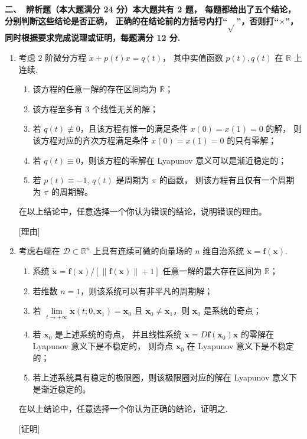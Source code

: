 \textbf{二、\ 辨析题（本大题满分 24 分）本大题共有 2 题，
每题都给出了五个结论，分别判断这些结论是否正确，
正确的在结论前的方括号内打``$\sqrt{ }$''，否则打``$\times$''，
同时根据要求完成说理或证明，每题满分 12 分.}
\begin{enumerate}
\item 考虑 $2$ 阶微分方程 $\ddot{x}+p(t) x=q(t)$，
其中实值函数 $p(t), q(t)$ 在 $\mathbb{R}$ 上连续.
\begin{enumerate}[label=$【\qquad】$]
    \item 该方程的任意一解的存在区间均为 $\mathbb{R}$；
    \item 该方程至多有 $3$ 个线性无关的解；
    \item 若 $q(t) \not \equiv 0$，且该方程有惟一的满足条件 $x(0)=x(1)=0$ 的解，
    则该方程对应的齐次方程满足条件 $x(0)=x(1)=0$ 的只有零解；
    \item 若 $q(t) \equiv 0$，则该方程的零解在 Lyapunov 意义可以是渐近稳定的；
    \item 若 $p(t) \equiv-1$, $q(t)$ 是周期为 $\pi$ 的函数，
    则该方程有且仅有一个周期为 $\pi$ 的周期解。
\end{enumerate}
在以上结论中，任意选择一个你认为错误的结论，说明错误的理由。

[理由]

\item 考虑右端在 $\mathcal{D} \subset \mathbb{R}^n$ 上具有连续可微的向量场的 $n$ 维自治系统 
$\dot{\boldsymbol{x}}=\boldsymbol{f}(\boldsymbol{x})$.
\begin{enumerate}[label=$【\qquad】$]
    \item 系统 $\dot{\boldsymbol{x}}=\boldsymbol{f}(\boldsymbol{x}) /[\|\boldsymbol{f}(\boldsymbol{x})\|+1]$ 任意一解的最大存在区间为 $\mathbb{R}$；
    \item 若维数 $n=1$，则该系统可以有非平凡的周期解；
    \item 若 $\lim\limits_{t \rightarrow+\infty} \boldsymbol{x}(t ; 0, \boldsymbol{x}_1)=\boldsymbol{x}_0$ 
    且 $\boldsymbol{x}_0 \neq \boldsymbol{x}_1$，则 $\boldsymbol{x}_0$ 是系统的奇点；
    \item 若 $\boldsymbol{x}_0$ 是上述系统的奇点，
    并且线性系统 $\dot{\boldsymbol{x}}=D \boldsymbol{f}(\boldsymbol{x}_0) \boldsymbol{x}$ 的零解在 Lyapunov 意义下是不稳定的，
    则奇点 $\boldsymbol{x}_0$ 在 Lyapunov 意义下是不稳定的；
    \item 若上述系统具有稳定的极限圈，则该极限圈对应的解在 Lyapunov 意义下是渐近稳定的。
\end{enumerate}
在以上结论中，任意选择一个你认为正确的结论，证明之.

[证明]
\end{enumerate}
